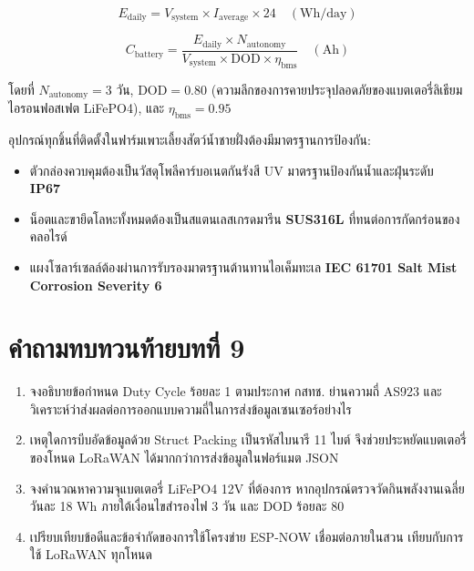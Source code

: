 \begin{equation}
E_{\text{daily}} = V_{\text{system}} \times I_{\text{average}} \times 24 \quad (\text{Wh/day})
\label{eq:daily_energy}
\end{equation}

\begin{equation}
C_{\text{battery}} = \frac{E_{\text{daily}} \times N_{\text{autonomy}}}{V_{\text{system}} \times \text{DOD} \times \eta_{\text{bms}}} \quad (\text{Ah})
\label{eq:battery_capacity}
\end{equation}

โดยที่ $N_{\text{autonomy}} = 3\text{ วัน}$, $\text{DOD} = 0.80$ (ความลึกของการคายประจุปลอดภัยของแบตเตอรี่ลิเธียมไอรอนฟอสเฟต LiFePO4), และ $\eta_{\text{bms}} = 0.95$

\begin{theorybox}
อุปกรณ์ทุกชิ้นที่ติดตั้งในฟาร์มเพาะเลี้ยงสัตว์น้ำชายฝั่งต้องมีมาตรฐานการป้องกัน:
\begin{itemize}[leftmargin=1.5em]
    \item ตัวกล่องควบคุมต้องเป็นวัสดุโพลีคาร์บอเนตกันรังสี UV มาตรฐานป้องกันน้ำและฝุ่นระดับ \textbf{IP67}
    \item น็อตและขายึดโลหะทั้งหมดต้องเป็นสแตนเลสเกรดมารีน \textbf{SUS316L} ที่ทนต่อการกัดกร่อนของคลอไรด์
    \item แผงโซลาร์เซลล์ต้องผ่านการรับรองมาตรฐานต้านทานไอเค็มทะเล \textbf{IEC 61701 Salt Mist Corrosion Severity 6}
\end{itemize}
\end{theorybox}

\section*{คำถามทบทวนท้ายบทที่ 9}

\begin{enumerate}
    \item จงอธิบายข้อกำหนด Duty Cycle ร้อยละ 1 ตามประกาศ กสทช. ย่านความถี่ AS923 และวิเคราะห์ว่าส่งผลต่อการออกแบบความถี่ในการส่งข้อมูลเซนเซอร์อย่างไร
    \item เหตุใดการบีบอัดข้อมูลด้วย Struct Packing เป็นรหัสไบนารี 11 ไบต์ จึงช่วยประหยัดแบตเตอรี่ของโหนด LoRaWAN ได้มากกว่าการส่งข้อมูลในฟอร์แมต JSON
    \item จงคำนวณหาความจุแบตเตอรี่ LiFePO4 12V ที่ต้องการ หากอุปกรณ์ตรวจวัดกินพลังงานเฉลี่ยวันละ 18 Wh ภายใต้เงื่อนไขสำรองไฟ 3 วัน และ DOD ร้อยละ 80
    \item เปรียบเทียบข้อดีและข้อจำกัดของการใช้โครงข่าย ESP-NOW เชื่อมต่อภายในสวน เทียบกับการใช้ LoRaWAN ทุกโหนด
\end{enumerate}
\clearpage

